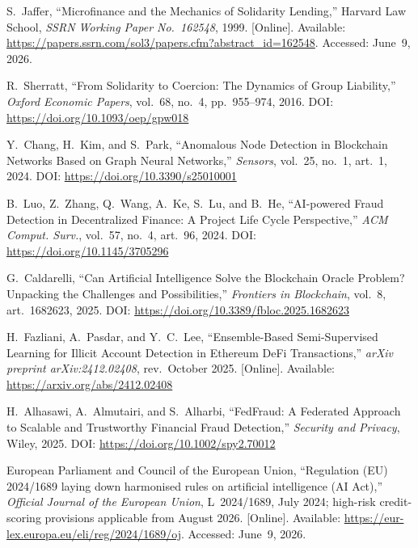 \documentclass[12pt,a4paper]{report}
\begin{document}
{\begin{enumerate}[label={[\arabic*]}]
\item S.~Jaffer, ``Microfinance and the Mechanics of Solidarity Lending,'' Harvard Law School, \textit{SSRN Working Paper No.~162548}, 1999. [Online]. Available: \url{https://papers.ssrn.com/sol3/papers.cfm?abstract_id=162548}. Accessed: June~9, 2026.

\item R.~Sherratt, ``From Solidarity to Coercion: The Dynamics of Group Liability,'' \textit{Oxford Economic Papers}, vol.~68, no.~4, pp.~955--974, 2016. DOI: \url{https://doi.org/10.1093/oep/gpw018}

\item Y.~Chang, H.~Kim, and S.~Park, ``Anomalous Node Detection in Blockchain Networks Based on Graph Neural Networks,'' \textit{Sensors}, vol.~25, no.~1, art.~1, 2024. DOI: \url{https://doi.org/10.3390/s25010001}

\item B.~Luo, Z.~Zhang, Q.~Wang, A.~Ke, S.~Lu, and B.~He, ``AI-powered Fraud Detection in Decentralized Finance: A Project Life Cycle Perspective,'' \textit{ACM Comput. Surv.}, vol.~57, no.~4, art.~96, 2024. DOI: \url{https://doi.org/10.1145/3705296}
\item G.~Caldarelli, ``Can Artificial Intelligence Solve the Blockchain Oracle Problem? Unpacking the Challenges and Possibilities,'' \textit{Frontiers in Blockchain}, vol.~8, art.~1682623, 2025. DOI: \url{https://doi.org/10.3389/fbloc.2025.1682623}
\item H.~Fazliani, A.~Pasdar, and Y.~C.~Lee, ``Ensemble-Based Semi-Supervised Learning for Illicit Account Detection in Ethereum DeFi Transactions,'' \textit{arXiv preprint arXiv:2412.02408}, rev.~October 2025. [Online]. Available: \url{https://arxiv.org/abs/2412.02408}

\item H.~Alhasawi, A.~Almutairi, and S.~Alharbi, ``FedFraud: A Federated Approach to Scalable and Trustworthy Financial Fraud Detection,'' \textit{Security and Privacy}, Wiley, 2025. DOI: \url{https://doi.org/10.1002/spy2.70012}

\item European Parliament and Council of the European Union, ``Regulation (EU) 2024/1689 laying down harmonised rules on artificial intelligence (AI Act),'' \textit{Official Journal of the European Union}, L~2024/1689, July 2024; high-risk credit-scoring provisions applicable from August 2026. [Online]. Available: \url{https://eur-lex.europa.eu/eli/reg/2024/1689/oj}. Accessed: June~9, 2026.


\end{enumerate}}
\end{document}
